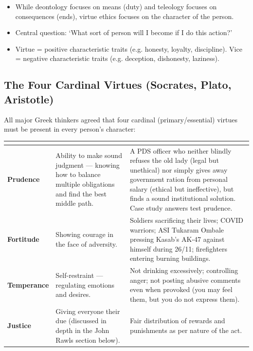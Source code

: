 \begin{KeyConcept}
\begin{itemize}
\item While deontology focuses on means (duty) and teleology focuses on consequences (ends), virtue ethics focuses on the character of the person.
\item Central question: `What sort of person will I become if I do this action?'
\item Virtue = positive characteristic traits (e.g. honesty, loyalty, discipline). Vice = negative characteristic traits (e.g. deception, dishonesty, laziness).
\end{itemize}
\end{KeyConcept}

\subsection*{The Four Cardinal Virtues (Socrates, Plato, Aristotle)}
All major Greek thinkers agreed that four cardinal (primary/essential) virtues must be present in every person's character:

\begin{tabularx}{\textwidth}{@{}>{\bfseries\color{Accent}}p{2.4cm} p{3.3cm} Y@{}}
\toprule
{} &  &  \\
\midrule
Prudence & Ability to make sound judgment --- knowing how to balance multiple obligations and find the best middle path. & A PDS officer who neither blindly refuses the old lady (legal but unethical) nor simply gives away government ration from personal salary (ethical but ineffective), but finds a sound institutional solution. Case study answers test prudence. \\
Fortitude & Showing courage in the face of adversity. & Soldiers sacrificing their lives; COVID warriors; ASI Tukaram Ombale pressing Kasab's AK-47 against himself during 26/11; firefighters entering burning buildings. \\
Temperance & Self-restraint --- regulating emotions and desires. & Not drinking excessively; controlling anger; not posting abusive comments even when provoked (you may feel them, but you do not express them). \\
Justice & Giving everyone their due (discussed in depth in the John Rawls section below). & Fair distribution of rewards and punishments as per nature of the act. \\
\bottomrule
\end{tabularx}

